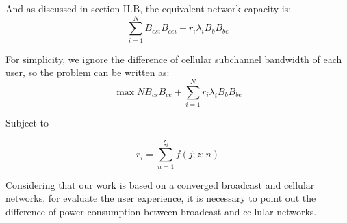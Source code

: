 \documentclass[conference]{IEEEtran}
\begin{document}
And as discussed in section II.B, the equivalent network capacity is:
 \begin{dmath}
\sum_{i=1}^N {B_{csi}B_{cei}} + r_i\lambda_i B_bB_{be}
    \label{eq:ec}
  \end{dmath}
  
  For simplicity, we ignore the difference of cellular subchannel bandwidth of each user, so the problem can be written as:
     \begin{dmath}
\max  N{B_{cs}B_{ce}} +  \sum_{i=1}^N r_i\lambda_i B_bB_{be}
    \label{eq:ec}
  \end{dmath}
  
 Subject to
   
 \begin{dmath}
 r_i=\sum_{n=1}^{\xi_i} f(j;z;n)
 \end{dmath}
 
Considering that our work is based on a converged broadcast and cellular networks, for evaluate the user experience, it is necessary to point out the difference of power consumption between broadcast and cellular networks.

%
%
%
%
\end{document}
